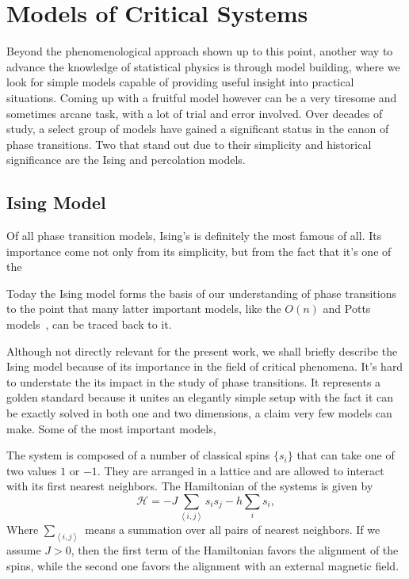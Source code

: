\section{Models of Critical Systems}
\label{sec:models}

Beyond the phenomenological approach shown up to this point, another way to
advance the knowledge of statistical physics is through model building, where
we look for simple models capable of providing useful insight into practical
situations. Coming up with a fruitful model however can be a very tiresome and
sometimes arcane task, with a lot of trial and error involved. Over decades of
study, a select group of models have gained a significant status in the canon
of phase transitions. Two that stand out due to their simplicity and historical
significance are the Ising and percolation models.


\subsection{Ising Model}
\label{sec:ising}

Of all phase transition models, Ising's is definitely the most famous of all.
Its importance come not only from its simplicity, but from the fact that it's
one of the 

Today the Ising model forms the basis of our understanding of phase transitions
to the point that many latter important models, like the $O(n)$ and Potts
models~\cite{Wu1982}, can be traced back to it.

Although not directly relevant for the present work, we shall briefly describe
the Ising model because of its importance in the field of critical phenomena.
It's hard to understate the its impact in the study of phase transitions. It
represents a golden standard because it unites an elegantly simple setup with
the fact it can be exactly solved in both one and two dimensions, a claim very
few models can make. Some of the most important models,

The system is composed of a number of classical spins $\{s_i\}$ that can take
one of two values $1$ or $-1$. They are arranged in a lattice and are allowed
to interact with its first nearest neighbors. The Hamiltonian of the systems is
given by
\begin{equation}
    \mathcal{H}=
    -J\sum_{\left\langle i,j\right\rangle }s_{i}s_{j}
    -h\sum_{i}s_{i},
\end{equation}
Where $\sum_{\left\langle i,j\right\rangle}$ means a summation over all pairs
of nearest neighbors. If we assume $J>0$, then the first term of the
Hamiltonian favors the alignment of the spins, while the second one 
favors the alignment with an external magnetic field.

